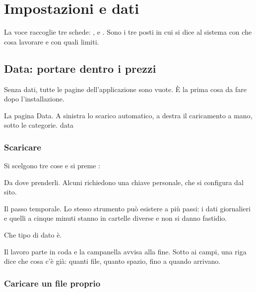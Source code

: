 \chapter{Impostazioni e dati}\label{cap:impostazioni}

La voce  raccoglie tre schede: ,  e
. Sono i tre posti in cui si dice al sistema con che cosa
lavorare e con quali limiti.

\section{Data: portare dentro i prezzi}\label{sez:data}

Senza dati, tutte le pagine dell'applicazione sono vuote. È la prima cosa da
fare dopo l'installazione.

  {La pagina Data. A sinistra lo scarico automatico, a destra il
   caricamento a mano, sotto le categorie.}
  {data}

\subsection{Scaricare}

Si scelgono tre cose e si preme :

\begin{description}[leftmargin = 1.4em, style = nextline, itemsep = 4pt]
  \item[\campo{Provider}] Da dove prenderli. Alcuni richiedono una chiave
    personale, che si configura dal sito.
  \item[\campo{Timeframe}] Il passo temporale. Lo stesso strumento può
    esistere a più passi: i dati giornalieri e quelli a cinque minuti
    stanno in cartelle diverse e non si danno fastidio.
  \item[\campo{Category}] Che tipo di dato è.
\end{description}

\noindent
Il lavoro parte in coda e la campanella avvisa alla fine. Sotto ai campi,
una riga dice che cosa c'è già: quanti file, quanto spazio, fino a quando
arrivano.

\subsection{Caricare un file proprio}

